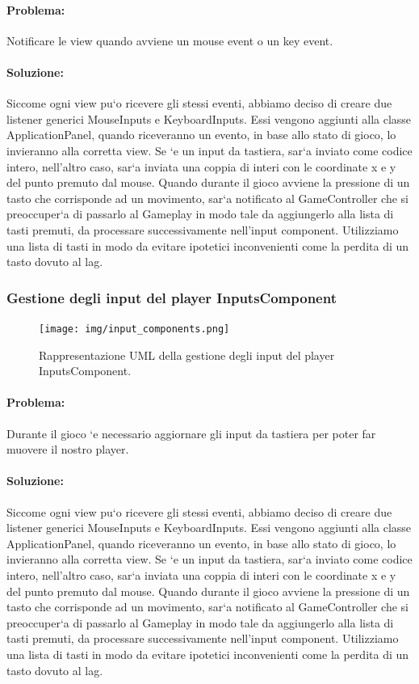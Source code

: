 \paragraph{Problema:}
Notificare le view quando avviene un mouse event o un key event.

\paragraph{Soluzione:}
Siccome ogni view pu`o ricevere gli stessi eventi, abbiamo deciso di creare due listener generici MouseInputs e KeyboardInputs. Essi vengono aggiunti alla classe ApplicationPanel, quando riceveranno un evento, in base allo stato di gioco, lo invieranno alla corretta view. Se `e un input da tastiera, sar`a inviato come codice intero, nell’altro caso, sar`a inviata una coppia di interi con le coordinate x e y del punto premuto dal mouse. Quando durante il gioco avviene la pressione di un tasto che corrisponde ad un movimento, sar`a notificato al GameController che si preoccuper`a di passarlo al Gameplay in modo tale da aggiungerlo alla lista di tasti premuti, da processare successivamente nell’input component. Utilizziamo una lista di tasti in modo da evitare ipotetici inconvenienti come la perdita di un tasto dovuto al lag.

\subsubsection{Gestione degli input del player InputsComponent}

\begin{figure}[H]
\centering{}
\texttt{[image: img/input\_components.png]}
\caption{Rappresentazione UML della gestione degli input del player InputsComponent.}
\end{figure}

\paragraph{Problema:}
Durante il gioco `e necessario aggiornare gli input da tastiera per poter far muovere il nostro player.

\paragraph{Soluzione:}
Siccome ogni view pu`o ricevere gli stessi eventi, abbiamo deciso di creare due listener generici MouseInputs e KeyboardInputs. Essi vengono aggiunti alla classe ApplicationPanel, quando riceveranno un evento, in base allo stato di gioco, lo invieranno alla corretta view. Se `e un input da tastiera, sar`a inviato come codice intero, nell’altro caso, sar`a inviata una coppia di interi con le coordinate x e y del punto premuto dal mouse. Quando durante il gioco avviene la pressione di un tasto che corrisponde ad un movimento, sar`a notificato al GameController che si preoccuper`a di passarlo al Gameplay in modo tale da aggiungerlo alla lista di tasti premuti, da processare successivamente nell’input component. Utilizziamo una lista di tasti in modo da evitare ipotetici inconvenienti come la perdita di un tasto dovuto al lag.

